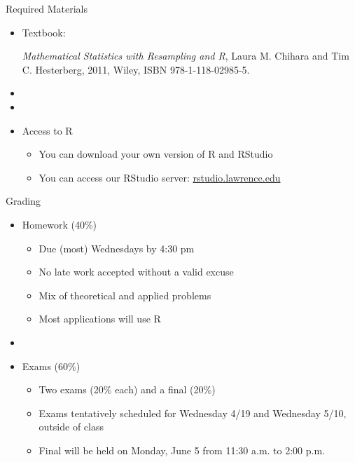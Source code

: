 \documentclass[10pt]{beamer}
\begin{document}
\begin{frame}[fragile]{Required Materials}

\begin{itemize}
\item Textbook:

 \emph{Mathematical Statistics with Resampling and R}, Laura M. Chihara and Tim C. Hesterberg, 2011, Wiley, ISBN 978-1-118-02985-5.

\item[]
\item[]

\item Access to R
	\begin{itemize}
	\item You can download your own version of R and RStudio
	\item You can access our RStudio server: \url{rstudio.lawrence.edu}
	\end{itemize}

\end{itemize}


\end{frame}

\begin{frame}[fragile]{Grading}

\begin{itemize}
\item Homework (40\%)
	\begin{itemize}
	\item Due (most) Wednesdays by 4:30 pm
	\item No late work accepted without a valid excuse
	\item Mix of theoretical and applied problems
	\item Most applications will use R	
	\end{itemize}


\item[]

\item Exams (60\%)
	\begin{itemize}
	\item Two exams (20\% each) and a final (20\%)
	\item Exams tentatively scheduled for Wednesday 4/19 and Wednesday 5/10, outside of class
	\item Final will be held on Monday, June 5 from 11:30 a.m. to 2:00 p.m.	\end{itemize}

\end{itemize}


\end{frame}
\end{document}

